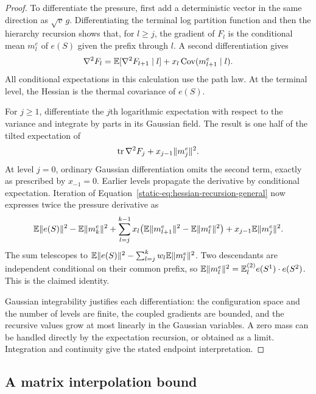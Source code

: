 \begin{proof}
To differentiate the pressure, first add a deterministic vector in the
same direction as $\sqrt v\,g$. Differentiating the terminal log
partition function and then the hierarchy recursion shows that, for
$l\ge j$, the gradient of $F_l$ is the conditional mean $m_l^e$ of
$e(S)$ given the prefix through $l$. A second differentiation gives
\begin{equation}\label{static-eq:hessian-recursion-general}
 \nabla^2F_l
 =\mathbb E[\nabla^2F_{l+1}\mid l]
   +x_l\operatorname{Cov}(m_{l+1}^e\mid l).
\end{equation}
All conditional expectations in this calculation use the path law.
At the terminal level, the Hessian is the thermal covariance of $e(S)$.

For $j\ge1$, differentiate the $j$th logarithmic expectation with
respect to the variance and integrate by parts in its Gaussian field. The result
is one half of the tilted expectation of
\[
 \operatorname{tr}\nabla^2F_j+x_{j-1}\|m_j^e\|^2.
\]
At level $j=0$, ordinary Gaussian differentiation omits the second
term, exactly as prescribed by $x_{-1}=0$. Earlier levels propagate
the derivative by conditional expectation. Iteration of
Equation~\eqref{static-eq:hessian-recursion-general} now expresses twice
the pressure derivative as
\[
 \mathbb E\|e(S)\|^2-\mathbb E\|m_k^e\|^2
 +\sum_{l=j}^{k-1}x_l
       \bigl(\mathbb E\|m_{l+1}^e\|^2-\mathbb E\|m_l^e\|^2\bigr)
 +x_{j-1}\mathbb E\|m_j^e\|^2.
\]
The sum telescopes to
$\mathbb E\|e(S)\|^2-\sum_{l=j}^kw_l\mathbb E\|m_l^e\|^2$.
Two descendants are independent conditional on their common prefix,
so $\mathbb E\|m_l^e\|^2=\mathbb E_l^{(2)}e(S^1)\cdot e(S^2)$. This is the
claimed identity.

Gaussian integrability justifies each differentiation: the configuration
space and the number of levels are finite, the coupled gradients are
bounded, and the recursive values grow at most linearly in the Gaussian
variables. A zero mass can be handled directly by the expectation
recursion, or obtained as a limit. Integration and continuity give the
stated endpoint interpretation.
\end{proof}

\subsection{A matrix interpolation bound}

